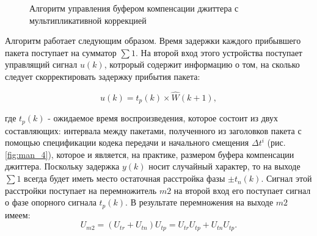 \begin{figure}[!h]
\caption{Алгоритм управления буфером компенсации джиттера с мультипликативной коррекцией}
\label{fig:man_3}
\end{figure}

Алгоритм работает следующим образом. 
Время задержки каждого прибывшего пакета поступает на сумматор $\sum 1$. 
На второй вход этого устройства поступает управлящий сигнал $u(k)$, котрорый содержит информацию о том, на сколько следует скорректировать задержку прибытия пакета:

\begin{equation}\label{eq41:man13}
u(k)=t_p(k)\times \hat W(k+1),
\end{equation}

\noindent где $t_p(k)$ - ожидаемое время воспроизведения, которое состоит из двух составляющих: интервала между пакетами, полученного из заголовков пакета с помощью спецификации кодека передачи и начального смещения $\Delta t^i$ (рис. \ref{fig:man_4}), которое и является, на практике, размером буфера компенсации джиттера.
Поскольку задержка $y(k)$ носит случайный характер, то на выходе $\sum 1$ всегда будет иметь место остаточная расстройка фазы $\pm t_n(k)$.
Сигнал этой расстройки поступает на перемножитель $m2$ на второй вход его поступает сигнал о фазе опорного сигнала $t_p(k)$. 
В результате перемножения на выходе $m2$ имеем:
\begin{equation}\label{eq41:man14}
U_{m2}=(U_{tr}+U_{tn})U_{tp}=U_{tr}U_{tp}+U_{tn}U_{tp}.
\end{equation}

